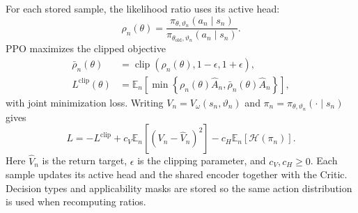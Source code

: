 For each stored sample, the likelihood ratio uses its active head:
\begin{equation}
 \rho_n(\theta)=\frac{\pi_{\theta,\vartheta_n}(a_n\mid s_n)}
 {\pi_{\theta_{\mathrm{old}},\vartheta_n}(a_n\mid s_n)}.
 \label{eq:policy_ratio}
\end{equation}
PPO maximizes the clipped objective~\cite{schulman2017ppo}
\begin{equation}
 \begin{aligned}
 \bar\rho_n(\theta)
 &=\operatorname{clip}(\rho_n(\theta),1-\epsilon,1+\epsilon),\\
 L^{\mathrm{clip}}(\theta)
 &=\mathbb E_n\!\left[\min\left\{
 \rho_n(\theta)\widehat A_n,\bar\rho_n(\theta)\widehat A_n\right\}\right],
 \end{aligned}
 \label{eq:ppo_clip}
\end{equation}
with joint minimization loss. Writing $V_n=V_\omega(s_n,\vartheta_n)$ and $\pi_n=\pi_{\theta,\vartheta_n}(\cdot\mid s_n)$ gives
\begin{equation}
 L=-L^{\mathrm{clip}}+c_V\mathbb E_n[(V_n-\widehat V_n)^2]
 -c_H\mathbb E_n[\mathcal H(\pi_n)].
 \label{eq:ppo_total_loss}
\end{equation}
Here $\widehat V_n$ is the return target, $\epsilon$ is the clipping parameter, and $c_V,c_H\ge0$.
Each sample updates its active head and the shared encoder together with the Critic. Decision types
and applicability masks are stored so the same action distribution is used when recomputing ratios.

